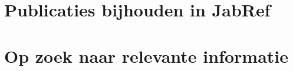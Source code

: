 
\section{Publicaties bijhouden in JabRef}
\label{sec:publicaties_bijhouden_in_jabref}
%
%
%
%
\section{Op zoek naar relevante informatie}
\label{sec:op_zoek_naar_relevante_informatie}

